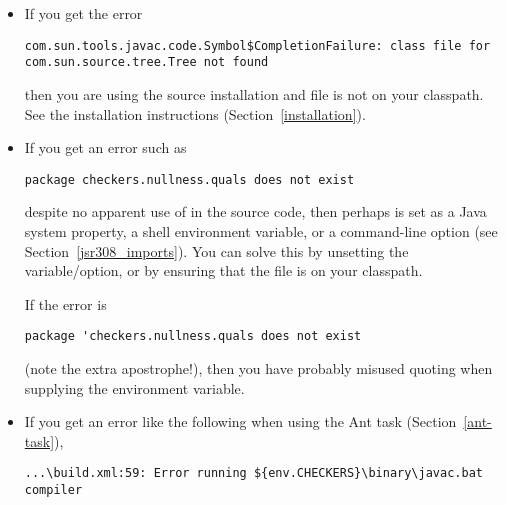 \begin{itemize}
\item
If you get the error

\begin{smaller}
\begin{Verbatim}
com.sun.tools.javac.code.Symbol$CompletionFailure: class file for com.sun.source.tree.Tree not found
\end{Verbatim}
\end{smaller}

\noindent
then you are using the source installation and file  is not
on your classpath.  See the installation instructions
(Section~\ref{installation}).

\item
If you get an error such as

\begin{Verbatim}
package checkers.nullness.quals does not exist
\end{Verbatim}

  \noindent
  despite no apparent use of  in
  the source code, then perhaps
   is set as a Java system property, a shell
  environment variable, or a command-line option (see
  Section~\ref{jsr308_imports}).  You can solve this by unsetting the
  variable/option, or by ensuring that the  file is on
  your classpath.

If the error is 

\begin{Verbatim}
package 'checkers.nullness.quals does not exist
\end{Verbatim}

\noindent
(note the extra apostrophe!), then you have probably misused quoting when
supplying the  environment variable.

\item
If you get an error like the following when using the Ant task
(Section~\ref{ant-task}),

\begin{smaller}
\begin{Verbatim}
...\build.xml:59: Error running ${env.CHECKERS}\binary\javac.bat compiler
\end{Verbatim}
\end{smaller}


\end{itemize}
